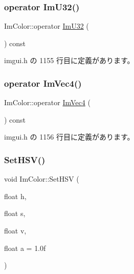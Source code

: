 \subsubsection{\texorpdfstring{operator Im\+U32()}{operator ImU32()}}
{\footnotesize\ttfamily Im\+Color\+::operator \mbox{\hyperlink{imgui_8h_a118cff4eeb8d00e7d07ce3d6460eed36}{Im\+U32}} (\begin{DoxyParamCaption}{ }\end{DoxyParamCaption}) const\hspace{0.3cm}{\ttfamily [inline]}}



 imgui.\+h の 1155 行目に定義があります。

\mbox{\label{struct_im_color_a10f1de242f13c93f8be64545e4cbcb0a}} 
\subsubsection{\texorpdfstring{operator Im\+Vec4()}{operator ImVec4()}}
{\footnotesize\ttfamily Im\+Color\+::operator \mbox{\hyperlink{struct_im_vec4}{Im\+Vec4}} (\begin{DoxyParamCaption}{ }\end{DoxyParamCaption}) const\hspace{0.3cm}{\ttfamily [inline]}}



 imgui.\+h の 1156 行目に定義があります。

\mbox{\label{struct_im_color_afcff20160db703b956d56e5a9fa88e24}} 
\subsubsection{\texorpdfstring{Set\+H\+S\+V()}{SetHSV()}}
{\footnotesize\ttfamily void Im\+Color\+::\+Set\+H\+SV (\begin{DoxyParamCaption}\item[{float}]{h,  }\item[{float}]{s,  }\item[{float}]{v,  }\item[{float}]{a = {\ttfamily 1.0f} }\end{DoxyParamCaption})\hspace{0.3cm}{\ttfamily [inline]}}




